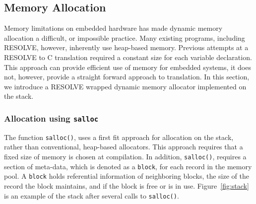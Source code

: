 







\subsection{Memory Allocation}\label{sec:mem}

Memory limitations on embedded hardware has made dynamic memory allocation a difficult, or impossible practice. Many existing programs, including RESOLVE, however,  inherently use heap-based memory. Previous attempts at a RESOLVE to C translation required a constant size for each variable declaration\cite{regula:2010}. This approach can provide efficient use of memory for embedded systems, it does not, however, provide a straight forward approach to translation. In this section, we introduce a RESOLVE wrapped dynamic memory allocator implemented on the stack.

\subsubsection{Allocation using \texttt{salloc}}

The function \texttt{salloc()}, uses a first fit approach for allocation on the stack, rather than conventional, heap-based allocators. This approach requires that a fixed size of memory is chosen at compilation. In addition, \texttt{salloc()}, requires a section of meta-data, which is denoted as a \texttt{block}, for each record in the memory pool. A \texttt{block} holds referential information of neighboring blocks, the size of the record the block maintains, and if the block is free or is in use. Figure~\ref{fig:stack} is an example of the stack after several calls to \texttt{salloc()}.

